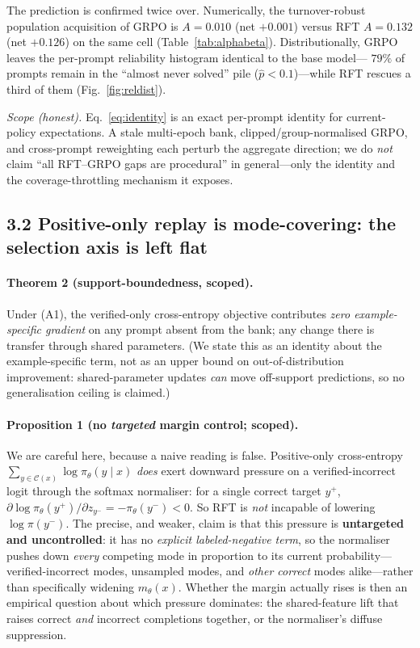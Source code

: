 The prediction is confirmed twice over. Numerically, the turnover-robust
population acquisition of GRPO is $A=0.010$ (net $+0.001$) versus RFT $A=0.132$
(net $+0.126$) on the same cell (Table~\ref{tab:alphabeta}). Distributionally,
GRPO leaves the per-prompt reliability histogram identical to the base model---%
$79\%$ of prompts remain in the ``almost never solved'' pile
($\hat p<0.1$)---while RFT rescues a third of them (Fig.~\ref{fig:reldist}).

\emph{Scope (honest).} Eq.~\eqref{eq:identity} is an exact per-prompt identity for
current-policy expectations. A stale multi-epoch bank, clipped/group-normalised
GRPO, and cross-prompt reweighting each perturb the aggregate direction; we do
\emph{not} claim ``all RFT--GRPO gaps are procedural'' in general---only the
identity and the coverage-throttling mechanism it exposes.

\subsection*{3.2 Positive-only replay is mode-covering: the selection axis is left flat}

\paragraph{Theorem 2 (support-boundedness, scoped).}
Under (A1), the verified-only cross-entropy objective contributes \emph{zero
example-specific gradient} on any prompt absent from the bank; any change there is
transfer through shared parameters. (We state this as an identity about the
example-specific term, not as an upper bound on out-of-distribution improvement:
shared-parameter updates \emph{can} move off-support predictions, so no
generalisation ceiling is claimed.)

\paragraph{Proposition 1 (no \emph{targeted} margin control; scoped).}
We are careful here, because a naive reading is false. Positive-only cross-entropy
$\sum_{y\in\mathcal{C}(x)}\log\pi_\theta(y\mid x)$ \emph{does} exert downward
pressure on a verified-incorrect logit through the softmax normaliser: for a single
correct target $y^{+}$,
$\partial\log\pi_\theta(y^{+})/\partial z_{y^{-}}=-\pi_\theta(y^{-})<0$. So RFT is
\emph{not} incapable of lowering $\log\pi(y^{-})$. The precise, and weaker, claim is
that this pressure is \textbf{untargeted and uncontrolled}: it has no
\emph{explicit labeled-negative term}, so the normaliser pushes down \emph{every}
competing mode in proportion to its current probability---verified-incorrect modes,
unsampled modes, and \emph{other correct} modes alike---rather than specifically
widening $m_\theta(x)$. Whether the margin actually rises is then an empirical
question about which pressure dominates: the shared-feature lift that raises correct
\emph{and} incorrect completions together, or the normaliser's diffuse suppression.

